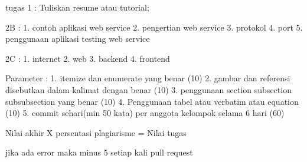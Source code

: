 tugas 1 :
Tuliskan resume atau tutorial;

2B :
1. contoh aplikasi web service
2. pengertian web service
3. protokol
4. port
5. penggunaan aplikasi testing web service


2C :
1. internet
2. web
3. backend
4. frontend

Parameter :
1. itemize dan enumerate yang benar (10)
2. gambar dan referensi disebutkan dalam kalimat dengan benar (10)
3. penggunaan section subsection subsubsection yang benar (10)
4. Penggunaan tabel atau verbatim atau equation (10)
5. commit sehari(min 50 kata) per anggota kelompok selama 6 hari (60)

Nilai akhir X persentasi plagiarisme = Nilai tugas


jika ada error maka minus 5 setiap kali pull request